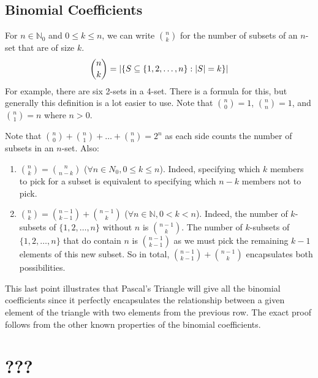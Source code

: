 \documentclass{article}
\begin{document}
\subsection{Binomial Coefficients}
For $n \in \mathbb N_0$ and $0 \leq k \leq n$, we can write $\binom{n}{k}$ for the number of subsets of an $n$-set that are of size $k$.
\[ \binom{n}{k} = \abs{\left\{ S \subseteq \{ 1, 2, \dots, n \}: \abs{S} = k \right\}} \]
For example, there are six 2-sets in a 4-set. There is a formula for this, but generally this definition is a lot easier to use. Note that $\binom{n}{0} = 1$, $\binom{n}{n} = 1$, and $\binom{n}{1}=n$ where $n>0$.

Note that $\binom{n}{0} + \binom{n}{1} + \dots + \binom{n}{n} = 2^n$ as each side counts the number of subsets in an $n$-set. Also:
\begin{enumerate}
	\item $\binom{n}{k} = \binom{n}{n-k}$ ($\forall n \in N_0, 0 \leq k \leq n$). Indeed, specifying which $k$ members to pick for a subset is equivalent to specifying which $n-k$ members not to pick.
	\item $\binom{n}{k} = \binom{n-1}{k-1} + \binom{n-1}{k}$ ($\forall n \in \mathbb N, 0 < k < n$). Indeed, the number of $k$-subsets of $\{ 1, 2, \dots, n \}$ without $n$ is $\binom{n-1}{k}$. The number of $k$-subsets of $\{ 1, 2, \dots, n \}$ that do contain $n$ is $\binom{n-1}{k-1}$ as we must pick the remaining $k-1$ elements of this new subset. So in total, $\binom{n-1}{k-1} + \binom{n-1}{k}$ encapsulates both possibilities.
\end{enumerate}
This last point illustrates that Pascal's Triangle will give all the binomial coefficients since it perfectly encapsulates the relationship between a given element of the triangle with two elements from the previous row. The exact proof follows from the other known properties of the binomial coefficients.

\section{???}
\end{document}
